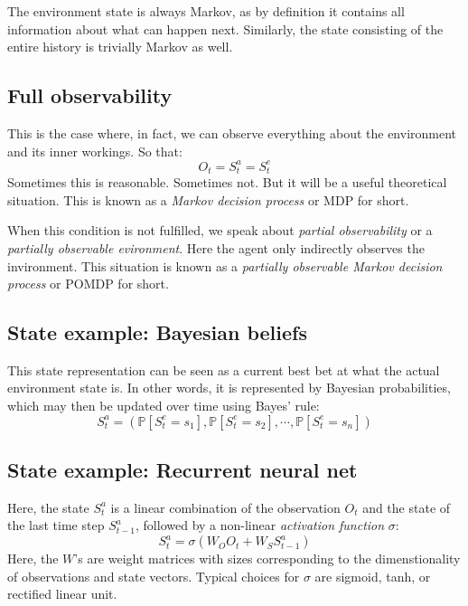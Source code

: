 \documentclass[12pt, a4paper]{article}
\numberwithin{equation}{section}
\begin{document}
The environment state is always Markov, as by definition it contains all information about what can happen next. Similarly, the state consisting of the entire history is trivially Markov as well.

\subsection{Full observability}
This is the case where, in fact, we can observe everything about the environment and its inner workings. So that:
\begin{equation}
O_t=S^a_t=S^e_t
\end{equation}
Sometimes this is reasonable. Sometimes not. But it will be a useful theoretical situation. This is known as a \textit{Markov decision process} or MDP for short.

When this condition is not fulfilled, we speak about \textit{partial observability} or a \textit{partially observable evironment}. Here the agent only indirectly observes the invironment. This situation is known as a \textit{partially observable Markov decision process} or POMDP for short.

\subsection{State example: Bayesian beliefs}
This state representation can be seen as a current best bet at what the actual environment state is. In other words, it is represented by Bayesian probabilities, which may then be updated over time using Bayes' rule:
\begin{equation}
S^a_t=(\mathbb{P}[S^e_t=s_1],\mathbb{P}[S^e_t=s_2],\cdots,\mathbb{P}[S^e_t=s_n])
\end{equation}

\subsection{State example: Recurrent neural net}
Here, the state $S^a_t$ is a linear combination of the observation $O_t$ and the state of the last time step $S^a_{t-1}$, followed by a non-linear \textit{activation function} $\sigma$:
\begin{equation}
S^a_t=\sigma(W_O O_t+W_S S^a_{t-1})
\end{equation}
Here, the $W$'s are weight matrices with sizes corresponding to the dimenstionality of observations and state vectors. Typical choices for $\sigma$ are sigmoid, tanh, or rectified linear unit.
\end{document}

